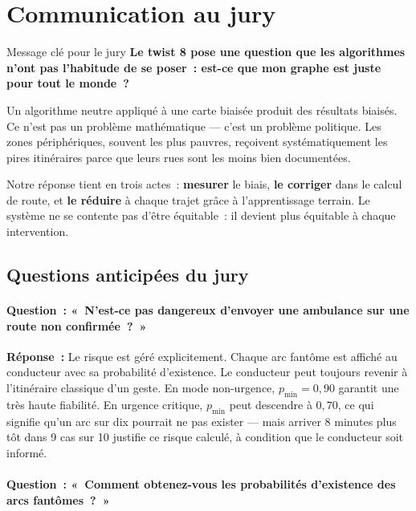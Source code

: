 \documentclass[12pt,a4paper]{article}
\theoremstyle{definition}
\theoremstyle{remark}
\begin{document}
\newpage

\section{Communication au jury}

\begin{jurybox}{Message clé pour le jury}
\textbf{Le twist 8 pose une question que les algorithmes n'ont pas l'habitude
de se poser~: est-ce que mon graphe est juste pour tout le monde~?}

\medskip
Un algorithme neutre appliqué à une carte biaisée produit des résultats
biaisés. Ce n'est pas un problème mathématique --- c'est un problème
politique. Les zones périphériques, souvent les plus pauvres, reçoivent
systématiquement les pires itinéraires parce que leurs rues sont les
moins bien documentées.

\medskip
Notre réponse tient en trois actes~: \textbf{mesurer} le biais,
\textbf{le corriger} dans le calcul de route,
et \textbf{le réduire} à chaque trajet grâce à l'apprentissage terrain.
Le système ne se contente pas d'être équitable~: il devient plus
équitable à chaque intervention.
\end{jurybox}

\subsection{Questions anticipées du jury}

\paragraph{Question~: «~N'est-ce pas dangereux d'envoyer une ambulance
sur une route non confirmée~?~»}

\noindent\textbf{Réponse~:} Le risque est géré explicitement.
Chaque arc fantôme est affiché au conducteur avec sa probabilité
d'existence. Le conducteur peut toujours revenir à l'itinéraire
classique d'un geste. En mode non-urgence, $p_{\min} = 0{,}90$
garantit une très haute fiabilité. En urgence critique, $p_{\min}$
peut descendre à $0{,}70$, ce qui signifie qu'un arc sur dix
pourrait ne pas exister --- mais arriver 8 minutes plus tôt dans
9 cas sur 10 justifie ce risque calculé, à condition que le conducteur
soit informé.

\paragraph{Question~: «~Comment obtenez-vous les probabilités
d'existence des arcs fantômes~?~»}
\end{document}
